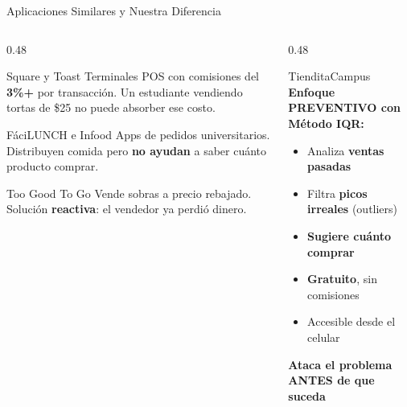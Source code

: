 \documentclass[aspectratio=169, 12pt]{beamer}
\newcommand{\tag}[1]{%
  \tikz[baseline=(t.base)]{\node[fill=bg2, draw=yellow1!30, text=yellow1,
  rounded corners=8pt, inner xsep=6pt, inner ysep=2pt,
  font=\tiny\bfseries] (t) {\MakeUppercase{#1}};}%
}
\begin{document}
\begin{frame}{\tag{Marco Te\'orico} \; Aplicaciones {\color{red1}Similares} y Nuestra Diferencia}
\vspace{2pt}
\begin{columns}[T]
\begin{column}{0.48\textwidth}
\begin{block}{Square y Toast}
\footnotesize Terminales POS con comisiones del \textbf{3\%+} por transacci\'on. Un estudiante vendiendo tortas de \$25 no puede absorber ese costo.
\end{block}
\vspace{2pt}
\begin{block}{F\'aciLUNCH e Infood}
\footnotesize Apps de pedidos universitarios. Distribuyen comida pero \textbf{no ayudan} a saber cu\'anto producto comprar.
\end{block}
\vspace{2pt}
\begin{block}{Too Good To Go}
\footnotesize Vende sobras a precio rebajado. Soluci\'on \textbf{reactiva}: el vendedor ya perdi\'o dinero.
\end{block}
\end{column}
\begin{column}{0.48\textwidth}
\begin{alertblock}{TienditaCampus}
\textbf{Enfoque PREVENTIVO con M\'etodo IQR:}
\begin{itemize}\small
  \item Analiza \textbf{ventas pasadas}
  \item Filtra \textbf{picos irreales} (outliers)
  \item \textbf{Sugiere cu\'anto comprar}
  \item \textbf{Gratuito}, sin comisiones
  \item Accesible desde el celular
\end{itemize}
\vspace{4pt}
{\color{green1}\bfseries\small Ataca el problema ANTES de que suceda}
\end{alertblock}
\end{column}
\end{columns}
\end{frame}
\end{document}

